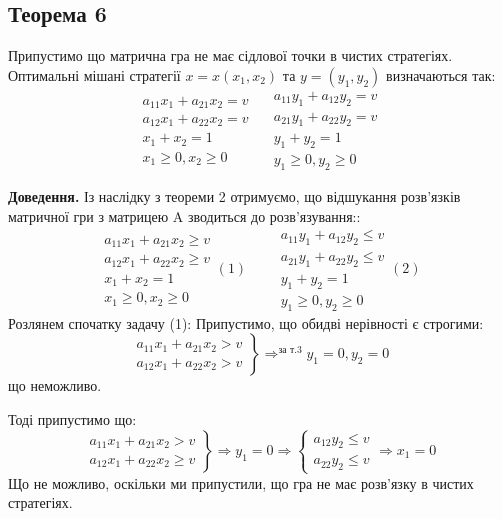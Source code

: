 \documentclass[12pt,a4paper]{book}
\begin{document}
\subsection{Теорема 6}
Припустимо що матрична гра не має сідлової точки в чистих стратегіях. Оптимальні мішані стратегії $x=x(x_1,x_2)$ та $y=(y_1,y_2)$ визначаються так:				
\[\begin{array}{l}
a_{11}x_1+a_{21}x_2=v \\
a_{12}x_1+a_{22}x_2=v \\
x_1+x_2=1	 \\
x_1 \ge 0, x_2 \ge0
\end{array} \quad
\begin{array}{l}
a_{11}y_1+a_{12}y_2=v \\
a_{21}y_1+a_{22}y_2=v \\
y_1+y_2=1	 \\
y_1\ge0,  y_2\ge0
\end{array}\]

{\bf Доведення.}
Із наслідку з теореми 2 отримуємо, що відшукання розв'язків матричної гри з матрицею A зводиться до розв'язування::
\[\begin{array}{l}
a_{11}x_1+a_{21}x_2\ge v \\
a_{12}x_1+a_{22}x_2\ge v \\
x_1+x_2=1	 \\
x_1 \ge 0, x_2 \ge0
\end{array} (1) \qquad 
\begin{array}{l}
a_{11}y_1+a_{12}y_2\le v \\
a_{21}y_1+a_{22}y_2\le v \\
y_1+y_2=1	 \\
y_1\ge0,  y_2\ge0
\end{array} (2)\]
Розлянем спочатку задачу (1):
Припустимо, що обидві нерівності є строгими: 
\[\left.\begin{array}{l}
a_{11}x_1+a_{21}x_2> v \\
a_{12}x_1+a_{22}x_2> v 
\end{array} \right \} \mathop{\Longrightarrow}^{\mbox{за т.3}} y_1=0, y_2=0 \]
що неможливо.

Тоді припустимо що:
\[\left.\begin{array}{l}
a_{11}x_1+a_{21}x_2> v \\
a_{12}x_1+a_{22}x_2 \ge v
\end{array} \right \} \Rightarrow y_1=0 \Rightarrow \left \{
\begin{array}{l}
a_{12}y_2\le v \\
a_{22}y_2\le v
\end{array} \right. \Rightarrow x_1=0\]
Що не можливо, оскільки ми припустили, що гра не має розв'язку в чистих стратегіях.
\end{document}
